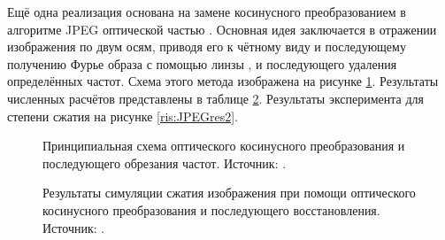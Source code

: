\FloatBarrier\par
Ещё одна реализация основана на замене косинусного преобразованием в алгоритме JPEG оптической частью \cite{alkholidi2007new}. Основная идея заключается в отражении изображения по двум осям, приводя его к чётному виду и последующему получению Фурье образа с помощью линзы \cite{goodman2005introduction}, и последующего удаления определённых частот. Схема этого метода изображена на рисунке \ref{ris:JPEG}. Результаты численных расчётов представлены в таблице \ref{ris:JPEGres}. Результаты эксперимента для степени сжатия на рисунке \ref{ris:JPEGres2}.
\begin{figure}[h]
	\caption{Принципиальная схема оптического косинусного преобразования и последующего обрезания частот. Источник: \cite{alkholidi2007new}.}
	\label{ris:JPEG}
\end{figure}
\begin{figure}[h]
	\caption{Результаты симуляции сжатия изображения при помощи оптического косинусного преобразования и последующего восстановления. Источник: \cite{alkholidi2007new}.}
	\label{ris:JPEGres}
\end{figure}

